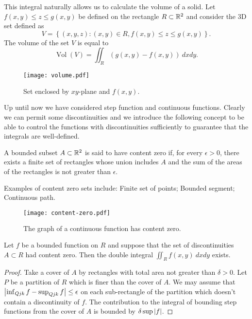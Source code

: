 This integral naturally allows us to calculate the volume of a solid.
Let \(f(x,y)\leq z \leq g(x,y)\) be defined on the rectangle \(R \subset \mathbb{R}^2\) and consider the 3D set defined as
\[
    V = \left\{(x,y,z): (x,y)\in R, f(x,y)\leq z \leq g(x,y) \right\}.
\]
The volume of the set \(V\) is equal to
          \[
              \operatorname{Vol}(V) = \iint_{R} \left(g(x,y) - f(x,y)\right)  \ dxdy.
          \]

\begin{figure}
    \centering
    \texttt{[image: volume.pdf]}
    \caption{Set enclosed by \(xy\)-plane and \(f(x,y)\).}
\end{figure}


Up until now we have considered step function and continuous functions.
Clearly we can permit some discontinuities and we introduce the following concept to be able to control the functions with discontinuities sufficiently to guarantee that the integrals are well-defined.

\begin{definition}
    A bounded subset \(A\subset \mathbb{R}^2\) is said to have content zero if, for every \(\epsilon>0\), there exists a finite set of rectangles whose union includes \(A\) and the sum of the areas of the rectangles is not greater than \(\epsilon\).
\end{definition}

Examples of content zero sets include:  Finite set of points; Bounded segment; Continuous path.

\begin{figure}
    \centering
    \texttt{[image: content-zero.pdf]}
    \caption{The graph of a continuous function has content zero.}
\end{figure}

\begin{theorem}
    Let \(f\) be a bounded function on \(R\) and suppose that the set of discontinuities \(A\subset R\) had content zero. Then the double integral \(\iint_{R}f(x,y) \ dxdy\) exists.
\end{theorem}
\begin{proof}
 Take a cover of \(A\) by rectangles with total area not greater than \(\delta>0\).
  Let \(P\) be a partition of \(R\) which is finer than the cover of \(A\).
     We may assume that \(\left|\inf_{Q{jk}} f - \sup_{Q{jk}} f \right|\leq \epsilon\)  on each sub-rectangle of the partition which doesn't contain a discontinuity of \(f\).
     The contribution to the integral of bounding step functions from the cover of \(A\) is bounded by \(\delta \sup \left|f\right|\).
\end{proof}


